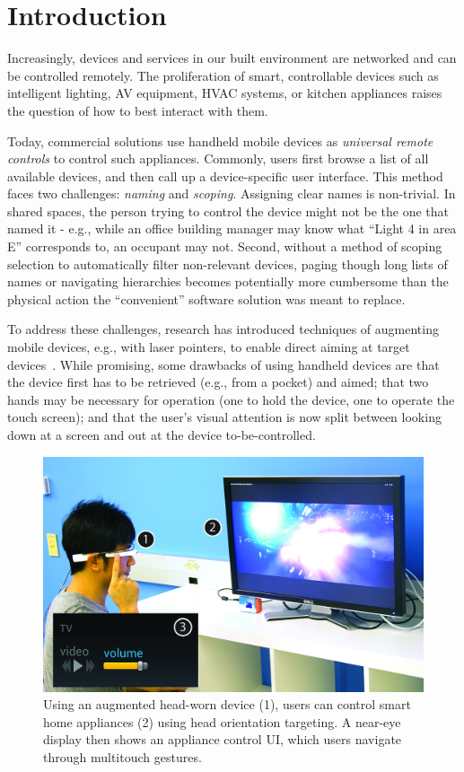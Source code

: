\section{Introduction}
Increasingly, devices and services in our built environment are networked and can be controlled remotely. The proliferation of smart, controllable devices such as intelligent lighting, AV equipment, HVAC systems, or kitchen appliances raises the question of how to best interact with them. 

Today, commercial solutions use handheld mobile devices as {\em universal remote controls} to control such appliances. Commonly, users first browse a list of all available devices, and then call up a device-specific user interface. This method faces two challenges: {\em naming} and {\em scoping}. Assigning clear names is non-trivial. In shared spaces, the person trying to control the device might not be the one that named it - e.g., while an office building manager may know what ``Light 4 in area E'' corresponds to, an occupant may not. Second, without a method of scoping selection to automatically filter non-relevant devices, paging though long lists of names or navigating hierarchies becomes potentially more cumbersome than the physical action the ``convenient'' software solution was meant to replace.

To address these challenges, research has introduced techniques of augmenting mobile devices, e.g., with laser pointers, to enable direct aiming at target devices~\cite{beigl_point_1999,patel_2-way_2003}. While promising, some drawbacks of using handheld devices are that the device first has to be retrieved (e.g., from a pocket) and aimed; that two hands may be necessary for operation (one to hold the device, one to operate the touch screen); and that the user's visual attention is now split between looking down at a screen and out at the device to-be-controlled. 

\begin{figure}[t]
\centering
\includegraphics[width=1.0\columnwidth]{figures/teaser.jpg}
\caption{Using an augmented head-worn device (1), users can control smart home appliances (2) using head orientation targeting. A near-eye display then shows an appliance control UI, which users navigate through multitouch gestures.}
\label{fig:teaser}
\end{figure}

